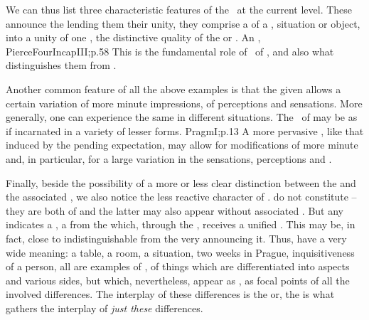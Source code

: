 \pa
We can thus list three characteristic features of the \oss\ at the current
level.
These  announce the  lending them their unity, they
comprise a  of a , situation or object, into a unity of
one , the distinctive quality of the  or .  An
, \citet{an emotion is always a simple predicate substituted by
  an operation of the mind for a highly complicated
  predicate.}{PierceFourIncap}{III;p.58} This is
the fundamental role of \oss\ of , and also what distinguishes them
from \rss.

Another common feature of all the above examples is that the given 
allows a certain variation of more minute impressions, of perceptions and
 sensations.  More generally, one can experience the same
 in different situations. The \oss\ of  may be as if
incarnated in a variety of lesser forms. \citet{Every one knows how when a
  painful thing has to be undergone in the near future, the vague feeling that
  it is impending penetrates all our thought with uneasiness and subtly vitiates
  our mood even when it does not control our attention; it keeps us from being
  at rest, at home in the given present.}{Pragm}{I;p.13} A more pervasive
, like that induced by the pending expectation, may allow for
modifications of more minute  and, in particular, for a large
variation in the sensations, perceptions and .

Finally, beside the possibility of a more or less clear distinction between the
 and the associated , we also notice the less
reactive character of .   do not constitute
 -- they are both  of  and the latter
may also appear without associated . But any 
indicates a , a  from the  which, through the
, receives a unified . This  may be, in
fact, close to indistinguishable from the very  announcing it.
Thus,  have a very wide meaning: a table, a room, a situation, two
weeks in Prague, inquisitiveness of a person, all are examples of ,
of things which are differentiated into aspects and various sides, but which,
nevertheless, appear as , as focal points of all the involved
differences. The interplay of these differences is the  or, the
 is what gathers the interplay of {\em just these} differences.


